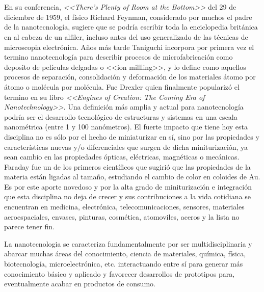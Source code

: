 \section{}
En su conferencia, \textit{<<There's Plenty of Room at the Bottom>>} del 29 de diciembre de 1959, el físico Richard Feynman, considerado por muchos el padre de la nanotecnología, sugiere que se podría escribir toda la enciclopedia británica en al cabeza de un alfiler, incluso antes del uso generalizado de las técnicas de microscopia electrónica.\cite{Feynman1959}  Años más tarde Taniguchi incorpora por primera vez el termino nanotecnología para describir procesos de microfabricación como deposito de películas delgadas o <<ion millling>>, y lo define como aquellos procesos de separación, consolidación y deformación de los materiales átomo por átomo o molécula por molécula. \cite{taniguchi1974} Fue Drexler quien finalmente popularizó el termino en su libro \textit{<<Engines of Creation: The Coming Era of Nanotechnology>>}\cite{drexler1987}. Una definición más amplia y actual para nanotecnología podría ser el desarrollo tecnológico de estructuras y sistemas en una escala nanométrica (entre 1 y 100 nanómetros). El fuerte impacto que tiene hoy esta disciplina no es sólo por el hecho de miniaturizar en sí, sino por las propiedades y características nuevas y/o diferenciales que surgen de dicha miniturización, ya sean cambio en las propiedades ópticas, eléctricas, magnéticas o mecánicas. Faraday fue un de los primeros científicos que sugirió que las propiedades de la materia están ligadas al tamaño, estudiando el cambio de color en coloides de Au\cite{faraday1857}. Es por este aporte novedoso y por la alta grado de miniturización e integración que esta disciplina no deja de crecer y sus contribuciones a la vida cotidiana se encuentran en medicina, electrónica, telecomunicaciones, sensores, materiales aeroespaciales, envases, pinturas, cosmética, atomoviles, aceros y la lista no parece tener fin. 

La nanotecnologia se caracteriza fundamentalmente por ser multidisciplinaria y abarcar muchas áreas del conocimiento, ciencia de materiales, química, física, biotecnología, microelectrónica, etc. interactuando entre sí para generar más conocimiento básico y aplicado y favorecer  desarrollos de prototipos para, eventualmente acabar en productos de consumo.

